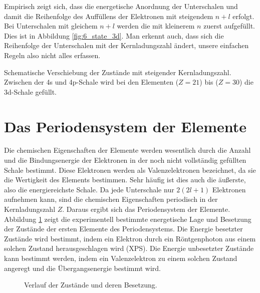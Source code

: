 Empirisch zeigt sich, dass die energetische Anordnung der Unterschalen und damit die Reihenfolge des Auffüllens der Elektronen mit steigendem $n+l$ erfolgt. Bei Unterschalen mit gleichem $n+l$ werden die mit kleinerem $n$ zuerst aufgefüllt. Dies ist in Abbildung  \ref{fig:6_state_3d}. Man erkennt auch, dass sich die Reihenfolge der Unterschalen mit der Kernladungszahl ändert, unsere einfachen Regeln also nicht alles erfassen.


\begin{marginfigure}
    \caption{Schematische Verschiebung der Zustände mit steigender Kernladungszahl. Zwischen der 4s und 4p-Schale wird bei den Elementen   ($Z=21$) bis  ($Z=30$) die 3d-Schale gefüllt.}
    \label{fig:6_state_3d}
\end{marginfigure}

\section{Das Periodensystem der Elemente}

Die chemischen Eigenschaften der Elemente werden wesentlich durch die Anzahl und die Bindungsenergie der Elektronen in der noch nicht vollständig gefüllten Schale bestimmt. Diese Elektronen werden als Valenzelektronen bezeichnet, da sie die Wertigkeit des Elements bestimmen. Sehr häufig ist dies auch die äußerste, also die energiereichste Schale. Da jede Unterschale nur $2 (2l +1)$ Elektronen aufnehmen kann, sind die chemischen Eigenschaften periodisch in der Kernladungszahl $Z$. Daraus ergibt sich das Periodensystem der Elemente. Abbildung \ref{fig:6:_PSE_states} zeigt die experimentell bestimmte energetische Lage und Besetzung der Zustände der ersten Elemente des Periodensystems. Die Energie besetzter Zustände wird bestimmt, indem ein Elektron durch ein Röntgenphoton aus einem solchen Zustand herausgeschlagen wird (XPS). Die Energie unbesetzter Zustände kann bestimmt werden, indem ein Valenzelektron zu einem solchen Zustand angeregt und die Übergangsenergie bestimmt wird.

\begin{figure}
    \caption{Verlauf der Zustände und deren Besetzung.}
    \label{fig:6:_PSE_states}
\end{figure}

